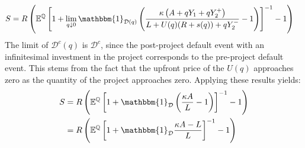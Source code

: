 \documentclass[../main.tex]{subfiles}
\begin{document}
            \begin{align}
                    S
                &=
                    \grossrfrate
                    \left(
                        \mathbb{E}^{\rnmeasure}\left[
                            1
                            +
                            \lim_{q\downarrow 0}
                            \mathbbm{1}_{\mathcal{D}(q)}
                            \left(
                                \frac{
                                    \kappa 
                                    \left(
                                        A + q Y_{1} + q Y_{2}^{+}
                                    \right)
                                }{
                                    L 
                                    +
                                    U(q)
                                    (\grossrfrate + s(q))
                                    +
                                    q Y_{2}^{-} 
                                }
                                -
                                1
                            \right) 
                        \right]^{-1}
                        - 
                        1
                    \right)
                \nonumber
            \end{align}
        The limit of $\mathcal{D}^{c}(q)$ is $\mathcal{D}^{c}$,
        since the post-project default event with an infinitesimal investment in the project
        corresponds to the pre-project default event.
        This stems from the fact that the upfront price of the $U(q)$
        approaches zero as the quantity of the project approaches zero.
        Applying these results yields:
            \begin{align}
                    S
                &=
                    \grossrfrate
                    \left(
                        \mathbb{E}^{\rnmeasure}\left[
                            1
                            +
                            \mathbbm{1}_{\mathcal{D}}
                            \left(
                                \frac{
                                    \kappa 
                                    A
                                }{
                                    L 
                                }
                                -
                                1
                            \right) 
                        \right]^{-1}
                        - 
                        1
                    \right)
                \nonumber \\
                &=
                    \grossrfrate
                    \left(
                        \mathbb{E}^{\rnmeasure}\left[
                            1
                            +
                            \mathbbm{1}_{\mathcal{D}}
                                \frac{
                                    \kappa 
                                    A
                                    -
                                    L
                                }{
                                    L 
                                }
                        \right]^{-1}
                        - 
                        1
                    \right)
                \label{eqn:limiting-credit-spread-step-1}
            \end{align}
\end{document}
